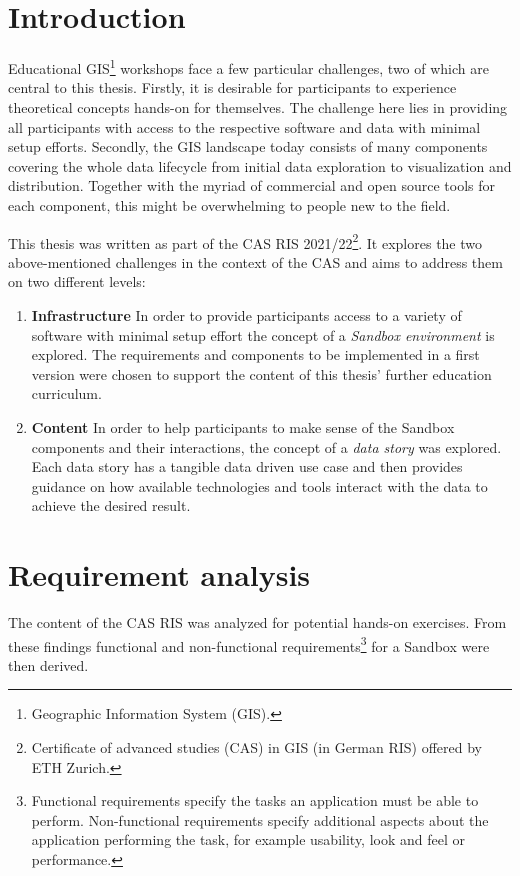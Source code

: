 \documentclass[11pt, a4paper, oneside, parskip=full-]{scrartcl}
\begin{document}
\section{Introduction}
Educational GIS\footnote{Geographic Information System (GIS).} workshops face a
few particular challenges, two of which are central to this thesis. Firstly, it
is desirable for participants to experience theoretical concepts hands-on for
themselves. The challenge here lies in providing all participants with access to
the respective software and data with minimal setup efforts. Secondly, the GIS
landscape today consists of many components covering the whole data lifecycle
from initial data exploration to visualization and distribution. Together with
the myriad of commercial and open source tools for each component, this might be
overwhelming to people new to the field.

This thesis was written as part of the CAS RIS 2021/22\footnote{Certificate of
advanced studies (CAS) in GIS (in German RIS) offered by ETH Zurich.}. It
explores the two above-mentioned challenges in the context of the CAS and aims
to address them on two different levels:
\begin{enumerate}
  \item \textbf{Infrastructure} In order to provide participants access to a
  variety of software with minimal setup effort the concept of a \emph{Sandbox
  environment} is explored. The requirements and components to be implemented in
  a first version were chosen to support the content of this thesis' further
  education curriculum.
  \item \textbf{Content} In order to help participants to make sense of the
  Sandbox components and their interactions, the concept of a \emph{data story}
  was explored. Each data story has a tangible data driven use case and then
  provides guidance on how available technologies and tools interact with the
  data to achieve the desired result.
\end{enumerate}


\section{Requirement analysis} \label{sectionrequirements}

The content of the CAS RIS was analyzed for potential hands-on exercises. From
these findings functional and non-functional requirements\footnote{Functional
requirements specify the tasks an application must be able to perform.
Non-functional requirements specify additional aspects about the application
performing the task, for example usability, look and feel or performance. } for
a Sandbox were then derived.
\end{document}

